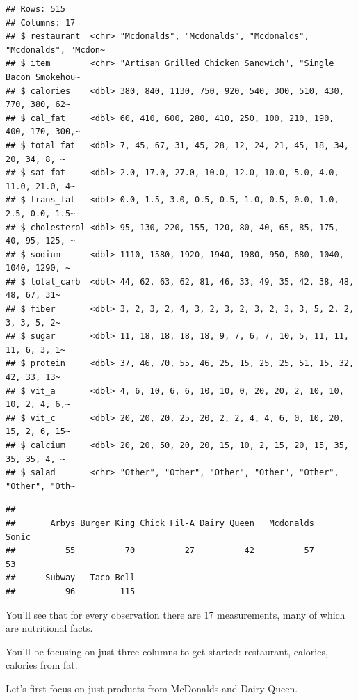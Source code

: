 \documentclass[
]{article}
\newenvironment{Shaded}{\begin{snugshade}}{\end{snugshade}}
\newcommand{\FunctionTok}[1]{\textcolor[rgb]{0.13,0.29,0.53}{\textbf{#1}}}
\newcommand{\NormalTok}[1]{#1}
\newcommand{\SpecialCharTok}[1]{\textcolor[rgb]{0.81,0.36,0.00}{\textbf{#1}}}
\begin{document}
\begin{verbatim}
## Rows: 515
## Columns: 17
## $ restaurant  <chr> "Mcdonalds", "Mcdonalds", "Mcdonalds", "Mcdonalds", "Mcdon~
## $ item        <chr> "Artisan Grilled Chicken Sandwich", "Single Bacon Smokehou~
## $ calories    <dbl> 380, 840, 1130, 750, 920, 540, 300, 510, 430, 770, 380, 62~
## $ cal_fat     <dbl> 60, 410, 600, 280, 410, 250, 100, 210, 190, 400, 170, 300,~
## $ total_fat   <dbl> 7, 45, 67, 31, 45, 28, 12, 24, 21, 45, 18, 34, 20, 34, 8, ~
## $ sat_fat     <dbl> 2.0, 17.0, 27.0, 10.0, 12.0, 10.0, 5.0, 4.0, 11.0, 21.0, 4~
## $ trans_fat   <dbl> 0.0, 1.5, 3.0, 0.5, 0.5, 1.0, 0.5, 0.0, 1.0, 2.5, 0.0, 1.5~
## $ cholesterol <dbl> 95, 130, 220, 155, 120, 80, 40, 65, 85, 175, 40, 95, 125, ~
## $ sodium      <dbl> 1110, 1580, 1920, 1940, 1980, 950, 680, 1040, 1040, 1290, ~
## $ total_carb  <dbl> 44, 62, 63, 62, 81, 46, 33, 49, 35, 42, 38, 48, 48, 67, 31~
## $ fiber       <dbl> 3, 2, 3, 2, 4, 3, 2, 3, 2, 3, 2, 3, 3, 5, 2, 2, 3, 3, 5, 2~
## $ sugar       <dbl> 11, 18, 18, 18, 18, 9, 7, 6, 7, 10, 5, 11, 11, 11, 6, 3, 1~
## $ protein     <dbl> 37, 46, 70, 55, 46, 25, 15, 25, 25, 51, 15, 32, 42, 33, 13~
## $ vit_a       <dbl> 4, 6, 10, 6, 6, 10, 10, 0, 20, 20, 2, 10, 10, 10, 2, 4, 6,~
## $ vit_c       <dbl> 20, 20, 20, 25, 20, 2, 2, 4, 4, 6, 0, 10, 20, 15, 2, 6, 15~
## $ calcium     <dbl> 20, 20, 50, 20, 20, 15, 10, 2, 15, 20, 15, 35, 35, 35, 4, ~
## $ salad       <chr> "Other", "Other", "Other", "Other", "Other", "Other", "Oth~
\end{verbatim}

\begin{Shaded}
\end{Shaded}

\begin{verbatim}
## 
##       Arbys Burger King Chick Fil-A Dairy Queen   Mcdonalds       Sonic 
##          55          70          27          42          57          53 
##      Subway   Taco Bell 
##          96         115
\end{verbatim}

You'll see that for every observation there are 17 measurements, many of
which are nutritional facts.

You'll be focusing on just three columns to get started: restaurant,
calories, calories from fat.

Let's first focus on just products from McDonalds and Dairy Queen.
\end{document}
